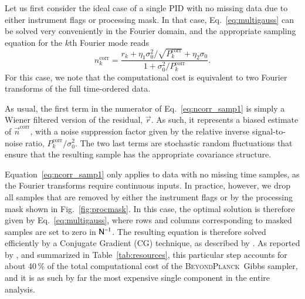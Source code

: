 \documentclass[twocolumn]{aa}
\newcommand{\n}[0]{\vec{n}}
\newcommand{\N}[0]{\tens{N}}
\renewcommand{\r}[0]{\vec{r}}
\newcommand{\BP}{\textsc{BeyondPlanck}}
\begin{document}
Let us first consider the ideal case of a single PID with no missing
data due to either instrument flags or processing mask. In that
case, Eq.~\eqref{eq:multigauss} can be solved very conveniently in
the Fourier domain, and the appropriate sampling equation for the $k$th
Fourier mode reads
\begin{equation}
n^{\mathrm{corr}}_k = \frac{r_k + \eta_1\sigma_0^2/\sqrt{P_k^{\mathrm{corr}}} + \eta_2\sigma_0
  }{1 + \sigma_0^2/P^{\mathrm{corr}}_k}.
\label{eq:ncorr_samp1}
\end{equation}
For this case, we note that the computational cost is equivalent to
two Fourier transforms of the full time-ordered data.

As usual, the first term in the numerator of Eq.~\eqref{eq:ncorr_samp1}
is simply a Wiener filtered version of the residual, $\r$. As such, it
represents a biased estimate of $\n^{\mathrm{corr}}$, with a noise
suppression factor given by the relative inverse signal-to-noise
ratio, $P^{\mathrm{corr}}_k/\sigma_0^2$. The two last terms are
stochastic random fluctuations that ensure that the resulting sample
has the appropriate covariance structure.

Equation~\eqref{eq:ncorr_samp1} only applies to data with no missing
time samples, as the Fourier transforms require continuous inputs. In
practice, however, we drop all samples that are removed by either the
instrument flags or by the processing mask shown in
Fig.~\ref{fig:procmask}. In this case, the optimal solution is
therefore given by Eq.~\eqref{eq:multigauss}, where rows and columns
corresponding to masked samples are set to zero in $\N^{-1} $. The resulting
equation is therefore solved efficiently by a Conjugate Gradient (CG)
technique, as described by \citet{bp02}. As reported by \citet{bp03},
and summarized in Table~\ref{tab:resources}, this particular step
accounts for about 40\,\% of the total computational cost of the
\BP\ Gibbs sampler, and it is as such by far the most expensive single
component in the entire analysis.
\end{document}
